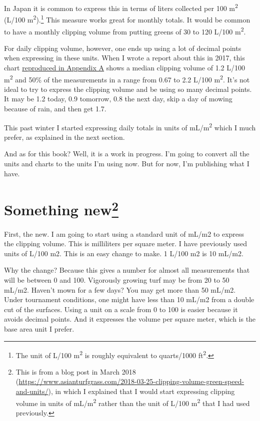 \documentclass[12pt,b5,]{tufte-book}
\begin{document}
In Japan it is common to express this in terms of liters collected per 100 m\textsuperscript{2} (L/100 m\textsuperscript{2}).\footnote{The unit of L/100 m\textsuperscript{2} is roughly equivalent to quarts/1000 ft\textsuperscript{2}.} This measure works great for monthly totals. It would be common to have a monthly clipping volume from putting greens of 30 to 120 L/100 m\textsuperscript{2}.

For daily clipping volume, however, one ends up using a lot of decimal points when expressing in these units. When I wrote a report about this in 2017, this chart \protect\hyperlink{volHistogram}{reproduced in Appendix A} shows a median clipping volume of 1.2 L/100 m\textsuperscript{2} and 50\% of the measurements in a range from 0.67 to 2.2 L/100 m\textsuperscript{2}. It's not ideal to try to express the clipping volume and be using so many decimal points. It may be 1.2 today, 0.9 tomorrow, 0.8 the next day, skip a day of mowing because of rain, and then get 1.7.

This past winter I started expressing daily totals in units of mL/m\textsuperscript{2} which I much prefer, as explained in the next section.

And as for this book? Well, it is a work in progress. I'm going to convert all the units and charts to the units I'm using now. But for now, I'm publishing what I have.

\hypertarget{something-new}{%
\section[Something new]{\texorpdfstring{Something new\footnote{This is from a blog post in March 2018 (\url{https://www.asianturfgrass.com/2018-03-25-clipping-volume-green-speed-and-units/}), in which I explained that I would start expressing clipping volume in units of mL/m\textsuperscript{2} rather than the unit of L/100 m\textsuperscript{2} that I had used previously.}}{Something new}}\label{something-new}}

First, the new. I am going to start using a standard unit of mL/m2 to express the clipping volume. This is milliliters per square meter. I have previously used units of L/100 m2. This is an easy change to make. 1 L/100 m2 is 10 mL/m2.

Why the change? Because this gives a number for almost all measurements that will be between 0 and 100. Vigorously growing turf may be from 20 to 50 mL/m2. Haven't mown for a few days? You may get more than 50 mL/m2. Under tournament conditions, one might have less than 10 mL/m2 from a double cut of the surfaces. Using a unit on a scale from 0 to 100 is easier because it avoids decimal points. And it expresses the volume per square meter, which is the base area unit I prefer.
\end{document}
